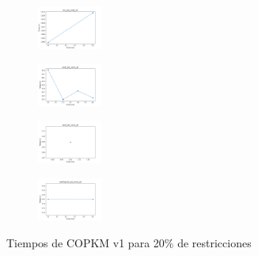 \begin{figure}[H]
\begin{subfigure}
    \end{subfigure}
    \hfill
    \begin{subfigure}
        \centering
        \includegraphics[width=0.234\textwidth]{img/copkm/iris_set_const_20_3773969821_time.png}
    \end{subfigure}
    \hfill
    \begin{subfigure}
        \centering
        \includegraphics[width=0.234\textwidth]{img/copkm/ecoli_set_const_20_3773969821_time.png}
    \end{subfigure}
    \hfill
    \begin{subfigure}
        \centering
        \includegraphics[width=0.234\textwidth]{img/copkm/rand_set_const_20_3773969821_time.png}
    \end{subfigure}
    \hfill
    \begin{subfigure}
        \centering
        \includegraphics[width=0.234\textwidth]{img/copkm/newthyroid_set_const_20_3773969821_time.png}
    \end{subfigure}
    \caption{Tiempos de COPKM v1 para 20\% de restricciones}
\end{figure}

\vspace*{\fill}

\newpage

\vspace*{\fill}


